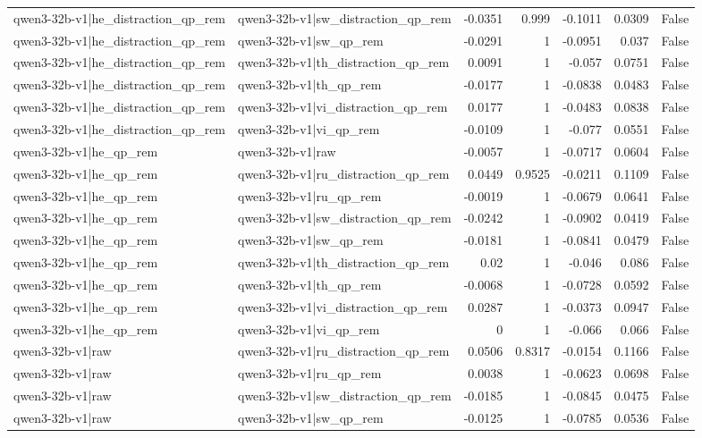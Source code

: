 \begin{table}
\begin{tabular}{l l r r r r l}
qwen3-32b-v1|he_distraction_qp_rem & qwen3-32b-v1|sw_distraction_qp_rem & -0.0351 & 0.999 & -0.1011 & 0.0309 & False \\
qwen3-32b-v1|he_distraction_qp_rem & qwen3-32b-v1|sw_qp_rem & -0.0291 & 1 & -0.0951 & 0.037 & False \\
qwen3-32b-v1|he_distraction_qp_rem & qwen3-32b-v1|th_distraction_qp_rem & 0.0091 & 1 & -0.057 & 0.0751 & False \\
qwen3-32b-v1|he_distraction_qp_rem & qwen3-32b-v1|th_qp_rem & -0.0177 & 1 & -0.0838 & 0.0483 & False \\
qwen3-32b-v1|he_distraction_qp_rem & qwen3-32b-v1|vi_distraction_qp_rem & 0.0177 & 1 & -0.0483 & 0.0838 & False \\
qwen3-32b-v1|he_distraction_qp_rem & qwen3-32b-v1|vi_qp_rem & -0.0109 & 1 & -0.077 & 0.0551 & False \\
qwen3-32b-v1|he_qp_rem & qwen3-32b-v1|raw & -0.0057 & 1 & -0.0717 & 0.0604 & False \\
qwen3-32b-v1|he_qp_rem & qwen3-32b-v1|ru_distraction_qp_rem & 0.0449 & 0.9525 & -0.0211 & 0.1109 & False \\
qwen3-32b-v1|he_qp_rem & qwen3-32b-v1|ru_qp_rem & -0.0019 & 1 & -0.0679 & 0.0641 & False \\
qwen3-32b-v1|he_qp_rem & qwen3-32b-v1|sw_distraction_qp_rem & -0.0242 & 1 & -0.0902 & 0.0419 & False \\
qwen3-32b-v1|he_qp_rem & qwen3-32b-v1|sw_qp_rem & -0.0181 & 1 & -0.0841 & 0.0479 & False \\
qwen3-32b-v1|he_qp_rem & qwen3-32b-v1|th_distraction_qp_rem & 0.02 & 1 & -0.046 & 0.086 & False \\
qwen3-32b-v1|he_qp_rem & qwen3-32b-v1|th_qp_rem & -0.0068 & 1 & -0.0728 & 0.0592 & False \\
qwen3-32b-v1|he_qp_rem & qwen3-32b-v1|vi_distraction_qp_rem & 0.0287 & 1 & -0.0373 & 0.0947 & False \\
qwen3-32b-v1|he_qp_rem & qwen3-32b-v1|vi_qp_rem & 0 & 1 & -0.066 & 0.066 & False \\
qwen3-32b-v1|raw & qwen3-32b-v1|ru_distraction_qp_rem & 0.0506 & 0.8317 & -0.0154 & 0.1166 & False \\
qwen3-32b-v1|raw & qwen3-32b-v1|ru_qp_rem & 0.0038 & 1 & -0.0623 & 0.0698 & False \\
qwen3-32b-v1|raw & qwen3-32b-v1|sw_distraction_qp_rem & -0.0185 & 1 & -0.0845 & 0.0475 & False \\
qwen3-32b-v1|raw & qwen3-32b-v1|sw_qp_rem & -0.0125 & 1 & -0.0785 & 0.0536 & False \\

\end{tabular}
\end{table}
